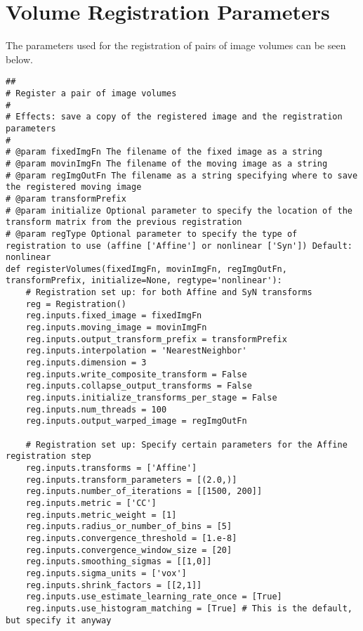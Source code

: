 \chapter{Volume Registration Parameters}
\label{appendix:registration-params}

The parameters used for the registration of pairs of image volumes can be seen below.

\begin{lstlisting}
##
# Register a pair of image volumes
#
# Effects: save a copy of the registered image and the registration parameters
#
# @param fixedImgFn The filename of the fixed image as a string
# @param movinImgFn The filename of the moving image as a string
# @param regImgOutFn The filename as a string specifying where to save the registered moving image
# @param transformPrefix 
# @param initialize Optional parameter to specify the location of the transform matrix from the previous registration
# @param regType Optional parameter to specify the type of registration to use (affine ['Affine'] or nonlinear ['Syn']) Default: nonlinear
def registerVolumes(fixedImgFn, movinImgFn, regImgOutFn, transformPrefix, initialize=None, regtype='nonlinear'):
    # Registration set up: for both Affine and SyN transforms
    reg = Registration()
    reg.inputs.fixed_image = fixedImgFn
    reg.inputs.moving_image = movinImgFn
    reg.inputs.output_transform_prefix = transformPrefix 
    reg.inputs.interpolation = 'NearestNeighbor'
    reg.inputs.dimension = 3
    reg.inputs.write_composite_transform = False 
    reg.inputs.collapse_output_transforms = False
    reg.inputs.initialize_transforms_per_stage = False
    reg.inputs.num_threads = 100
    reg.inputs.output_warped_image = regImgOutFn

    # Registration set up: Specify certain parameters for the Affine registration step
    reg.inputs.transforms = ['Affine']
    reg.inputs.transform_parameters = [(2.0,)]
    reg.inputs.number_of_iterations = [[1500, 200]] 
    reg.inputs.metric = ['CC'] 
    reg.inputs.metric_weight = [1]
    reg.inputs.radius_or_number_of_bins = [5] 
    reg.inputs.convergence_threshold = [1.e-8]
    reg.inputs.convergence_window_size = [20]
    reg.inputs.smoothing_sigmas = [[1,0]]
    reg.inputs.sigma_units = ['vox']
    reg.inputs.shrink_factors = [[2,1]]
    reg.inputs.use_estimate_learning_rate_once = [True]
    reg.inputs.use_histogram_matching = [True] # This is the default, but specify it anyway


\end{lstlisting}
